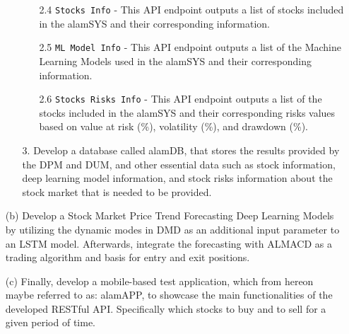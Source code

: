 \begin{itemize}
\begin{itemize}
\begin{itemize}
            \item [2.4]  \texttt{Stocks Info} - This API endpoint outputs a list of stocks included 
            in the alamSYS and their corresponding information.
            \item [2.5]  \texttt{ML Model Info} - This API endpoint outputs a list of the 
            Machine Learning Models used in the alamSYS and their corresponding information.
            \item [2.6] \texttt{Stocks Risks Info} - This API endpoint outputs a list 
            of the stocks included in the alamSYS and their corresponding 
            risks values based on value at risk (\%), volatility (\%), and drawdown (\%).
        \end{itemize}
      \item[3.] Develop a database called alamDB, that stores the results provided by the DPM and DUM,
      and other essential data such as stock information, deep learning model information,
      and stock risks information about the stock market that is needed to be provided.
    \end{itemize}

  \item[(b)] Develop a Stock Market Price Trend Forecasting 
  Deep Learning Models by utilizing the dynamic modes in DMD as an additional input 
  parameter to an LSTM model. Afterwards, integrate the forecasting with ALMACD as
  a trading algorithm and basis for entry and exit positions.

  \item[(c)] Finally, develop a mobile-based test application, which from hereon maybe referred to 
  as: alamAPP, to showcase the main functionalities of the developed RESTful API. 
  Specifically which stocks to buy and to sell for a given period of time.
\end{itemize}